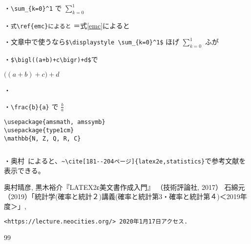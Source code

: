 \documentclass[a4paper,12pt,papersize,twocolumn,titlepage]{jsarticle}
\begin{document}
・\verb"\sum_{k=0}^1" で
$\sum_{k=0}^1$


・\verb"式\ref{emc}によると"
＝式\ref{emc}によると

・文章中で使うなら\verb"$\displaystyle \sum_{k=0}^1$" 
ほげ $\displaystyle \sum_{k=0}^1$ ふが

・\verb"$\bigl((a+b)+c\bigr)+d$"で

$\bigl((a+b)+c\bigr)+d$

・\verb""


・\verb"\frac{b}{a}" で
$\frac{b}{a}$


\begin{verbatim}
\usepackage{amsmath, amssymb}
\usepackage{type1cm}
\mathbb{N, Z, Q, R, C}
\end{verbatim}

\begin{verbatim}

\end{verbatim}


・奥村~\cite[181--204ページ]{latex2e,statistics}によると、\verb"~\cite[181--204ページ]{latex2e,statistics}"で参考文献を表示できる。
\begin{thebibliography}{99}
奥村晴彦, 黒木裕介『LATEX2ε美文書作成入門』
（技術評論社, 2017）
石綿元（2019）「統計学(確率と統計２)講義(確率と統計第3・確率と統計第４)＜2019年度＞」,
\begin{verbatim}
<https://lecture.neocities.org/> 2020年1月17日アクセス.
\end{verbatim}
\end{thebibliography}{99}
\end{document}
